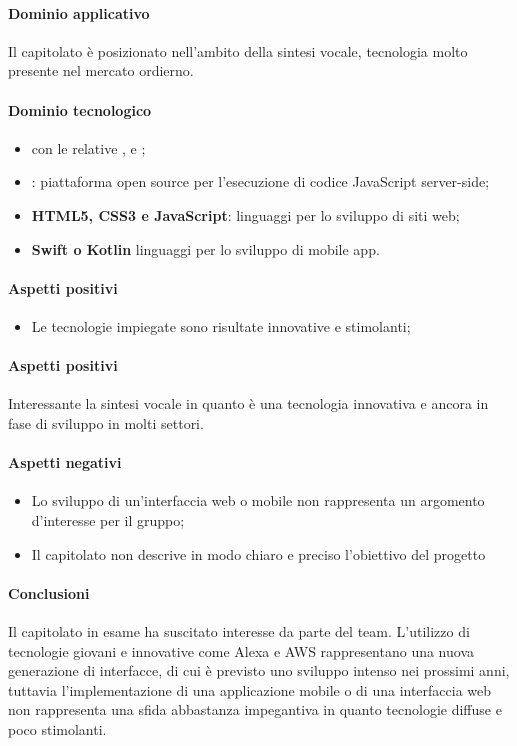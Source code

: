 	\paragraph{Dominio applicativo} 
     Il capitolato è posizionato nell'ambito della sintesi vocale, tecnologia molto presente nel mercato ordierno. 
	\paragraph{Dominio tecnologico}
	\begin{itemize}
		\item {\textbf{} con le relative ,  e };
		\item  \textbf{}: piattaforma open source per l'esecuzione di codice JavaScript server-side;
		\item \textbf{HTML5, CSS3 e JavaScript}: linguaggi per lo sviluppo di siti web;
		\item  \textbf{Swift o Kotlin} linguaggi per lo sviluppo di mobile app.
	\end{itemize}
	\paragraph{Aspetti positivi}
	\begin{itemize}
	\item {Le tecnologie impiegate sono risultate innovative e stimolanti;}
	\end{itemize}
	\paragraph{Aspetti positivi} 
	Interessante la sintesi vocale in quanto è una tecnologia innovativa e ancora in fase di sviluppo in molti settori.
	\paragraph{Aspetti negativi}
	\begin{itemize}
		\item Lo sviluppo di un'interfaccia web o mobile non rappresenta un argomento d'interesse per il gruppo;
		\item Il capitolato non descrive in modo chiaro e preciso l'obiettivo del progetto
	\end{itemize}
	\paragraph{Conclusioni} \Spazio
	Il capitolato in esame ha suscitato interesse da parte del team. L'utilizzo di tecnologie giovani e innovative come Alexa e AWS rappresentano una nuova generazione di interfacce, di cui è previsto uno sviluppo intenso nei prossimi anni, tuttavia l'implementazione di una applicazione mobile o di una interfaccia web non rappresenta una sfida abbastanza impegantiva in quanto tecnologie diffuse e poco stimolanti.
